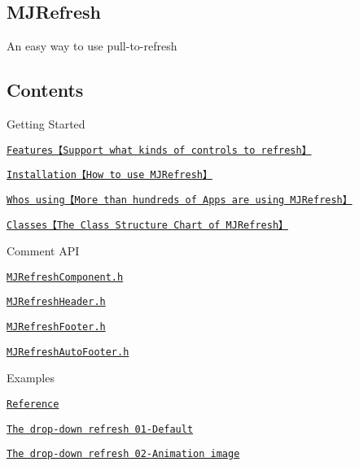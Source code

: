  \subsection*{M\+J\+Refresh}


\begin{DoxyItemize}
\item An easy way to use pull-\/to-\/refresh
\end{DoxyItemize}

\subsection*{Contents}


\begin{DoxyItemize}
\item Getting Started
\begin{DoxyItemize}
\item \href{#Support what kinds of controls to refresh}{\tt Features【\+Support what kinds of controls to refresh】}
\item \href{#How to use MJRefresh}{\tt Installation【\+How to use M\+J\+Refresh】}
\item \href{#>More than hundreds of Apps are using MJRefresh}{\tt Who\textquotesingle{}s using【\+More than hundreds of Apps are using M\+J\+Refresh】}
\item \href{#The Class Structure Chart of MJRefresh}{\tt Classes【\+The Class Structure Chart of M\+J\+Refresh】}
\end{DoxyItemize}
\item Comment A\+PI
\begin{DoxyItemize}
\item \href{#MJRefreshComponent.h}{\tt M\+J\+Refresh\+Component.\+h}
\item \href{#MJRefreshHeader.h}{\tt M\+J\+Refresh\+Header.\+h}
\item \href{#MJRefreshFooter.h}{\tt M\+J\+Refresh\+Footer.\+h}
\item \href{#MJRefreshAutoFooter.h}{\tt M\+J\+Refresh\+Auto\+Footer.\+h}
\end{DoxyItemize}
\item Examples
\begin{DoxyItemize}
\item \href{#Reference}{\tt Reference}
\item \href{#The drop-down refresh 01-Default}{\tt The drop-\/down refresh 01-\/\+Default}
\item \href{#The drop-down refresh 02-Animation image}{\tt The drop-\/down refresh 02-\/\+Animation image}

\end{DoxyItemize}
\end{DoxyItemize}
